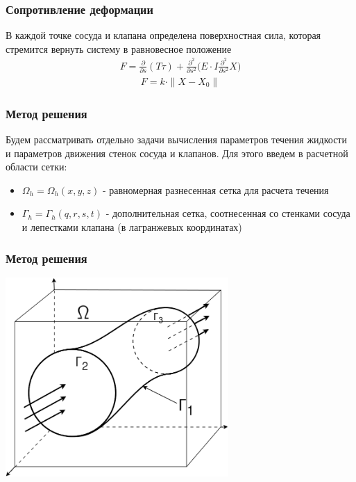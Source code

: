 \documentclass[14pt]{beamer}
\begin{document}
\begin{frame}
\frametitle{Сопротивление деформации}
В каждой точке сосуда и клапана определена поверхностная сила, которая стремится вернуть систему в равновесное положение
\begin{gather}
    \label{eq:strain_energy}
    F =  \frac{\partial}{\partial s}(T \tau) + \frac{\partial^2}{\partial s^2} \Big( E \cdot I \frac{\partial^2}{\partial s^2} X \Big)
\end{gather}
\begin{gather}
    \label{eq:define_boundary_force}
    F = k \cdot \|X - X_0\|
\end{gather}
\end{frame}

\begin{frame}
\frametitle{Метод решения}
Будем рассматривать отдельно задачи вычисления параметров течения жидкости и параметров движения стенок сосуда и клапанов. Для этого введем в расчетной области сетки:
\begin{itemize}
    \item[\MVRightarrow] $\Omega_h = \Omega_h(x, y, z)$ - равномерная разнесенная сетка для расчета течения
    \item[\MVRightarrow] $\Gamma_h = \Gamma_h(q, r, s, t)$ - дополнительная сетка, соотнесенная со стенками сосуда и лепестками клапана (в лагранжевых координатах)
\end{itemize}

\end{frame}

\begin{frame}
\frametitle{Метод решения}
    \begin{center}
        \includegraphics[width=8.5cm]{area_ibm_3d.png}
    \end{center}
\end{frame}
\end{document}
